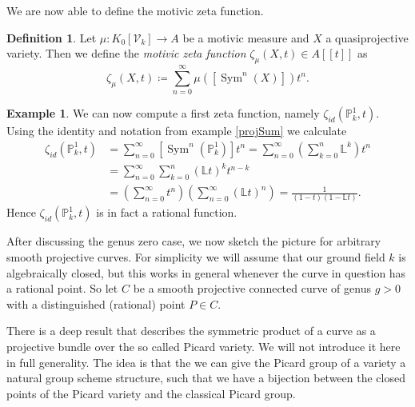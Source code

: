 \documentclass[11pt, a4paper, german, twoside]{article}
\theoremstyle{plain}
\theoremstyle{definition}
\newtheorem{definition}[theorem]{Definition}
\newtheorem{example}[theorem]{Example}
\newcommand{\gring}[1][k]{K_0[\mathcal{V}_#1]}
\DeclareMathOperator{\Sym}{Sym}
\begin{document}
We are now able to define the motivic zeta function.

\begin{definition}
    Let $\mu \colon \gring \to A$ be a motivic measure and $X$ a quasiprojective variety. Then we define the \emph{motivic zeta function} 
    $\zeta_{\mu}(X,t) \in A[[t]]$ as
    \[
        \zeta_{\mu}(X,t) \coloneqq \sum_{n=0}^\infty \mu([\Sym^n(X)])t^n.
    \]
\end{definition}

\begin{example}
    We can now compute a first zeta function, namely $\zeta_{id}(\mathbb{P}_k^1, t)$. Using the identity and notation from example \ref{projSum}
    we calculate
    \begin{align*}
        \zeta_{id}(\mathbb{P}_k^1, t) & = \sum_{n=0}^\infty \left[\Sym^n({\mathbb{P}_k^1})\right]t^n 
                                       = \sum_{n=0}^\infty \left(\sum_{k=0}^n \mathbb{L}^k\right) t^n \\
                                       & = \sum_{n=0}^\infty \sum_{k=0}^n \left(\mathbb{L}t\right)^k t^{n-k} \\
                                      & = \left( \sum_{n=0}^\infty t^n \right) \left( \sum_{n=0}^\infty (\mathbb{L}t)^n \right) 
                                        = \frac{1}{(1-t)(1-\mathbb{L}t)} .
    \end{align*}
    Hence $\zeta_{id}(\mathbb{P}_k^1, t)$ is in fact a rational function.
\end{example}


After discussing the genus zero case, we now sketch the picture for arbitrary smooth projective curves. 
For simplicity we will assume that our ground field $k$ is algebraically closed, but
this works in general whenever the curve in question has a rational point. 
So let $C$ be a smooth projective connected curve of genus $g > 0$ with a distinguished (rational) point $P \in C$.

There is a deep result that describes the symmetric product of a curve as a projective bundle over the so called Picard variety. We will
not introduce it here in full generality. The idea is that the we can give the Picard group of a variety a natural group scheme structure,
such that we have a bijection between the closed points of the Picard variety and the classical
Picard group. 
\end{document}
